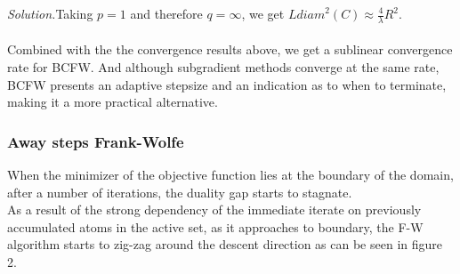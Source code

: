 \textit{Solution.}\quad Taking $p=1$ and therefore $q=\infty$, we get
$L\textit{diam}^{2}(C)\approx \frac{4}{\lambda}R^{2}$.\\ \\
Combined with the the convergence results above, we get a sublinear convergence
rate for BCFW. And although subgradient methods converge at the same rate, BCFW
presents an adaptive stepsize and an indication as to when to terminate, making
it a more practical alternative.



\subsubsection*{Away steps Frank-Wolfe}
When the minimizer of the objective function lies at the boundary of the domain,
after a number of iterations, the duality gap starts to stagnate.\\ As a result
of the strong dependency of the immediate iterate on previously accumulated
atoms in the active set, as it approaches to boundary, the F-W algorithm starts
to zig-zag around the descent direction as can be seen in figure 2.\\
\begin{algorithmic}
    \\
     \ENDFOR
\end{algorithmic}

